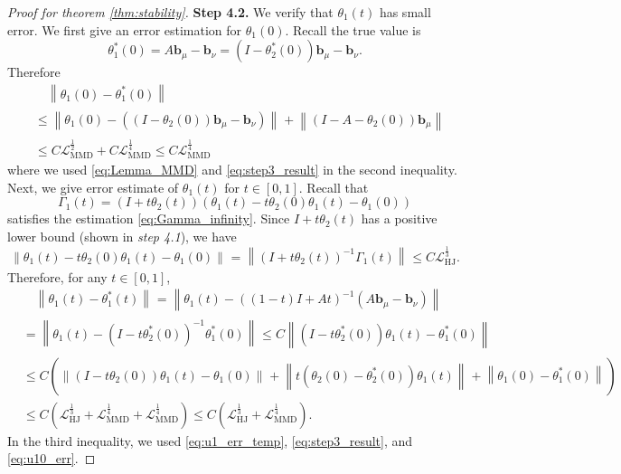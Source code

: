 \documentclass{article} %
\theoremstyle{plain}
\theoremstyle{definition}
\theoremstyle{remark}
\newcommand{\norm}[2][H^s]{\left\|#2\right\|_{#1}}
\newcommand{\bb}{\mathbf{b}}
\newcommand{\LMMD}{\mathcal{L}_{\text{MMD}}}
\newcommand{\LHJ}{\mathcal{L}_{\text{HJ}}}
\newcommand{\Gy}{\Gamma_1}
\newcommand{\parentheses}[1]{\left(#1\right)}
\begin{document}
\begin{proof}[Proof for theorem \ref{thm:stability}]
\medskip
\textbf{Step 4.2.} We verify that $\theta_1(t)$ has small error. We first give an error estimation for $\theta_1(0)$. Recall the true value is 
$$\theta_1^*(0) = A\bb_\mu - \bb_\nu = (I - \theta_2^*(0))\bb_\mu - \bb_\nu.$$
Therefore
\begin{equation}\label{eq:u10_err}
\begin{aligned}
& \quad \norm[]{\theta_1(0) - \theta_1^*(0)} \\
& \le \norm[]{\theta_1(0) - ((I-\theta_2(0))\bb_\mu - \bb_\nu)} + \norm[]{(I-A-\theta_2(0))\bb_\mu}\\
& \le C\LMMD^{\frac12} + C\LMMD^{\frac14} \le C\LMMD^{\frac14}
\end{aligned}
\end{equation}
where we used \eqref{eq:Lemma_MMD} and \eqref{eq:step3_result} in the second inequality. Next, we give error estimate of $\theta_1(t)$ for $t\in[0,1]$. Recall that
$$\Gy(t)  =\parentheses{I + t\theta_2(t)}\parentheses{\theta_1(t) - t \theta_2(0)\theta_1(t) - \theta_1(0)}$$
satisfies the estimation \eqref{eq:Gamma_infinity}. Since $I + t\theta_2(t)$ has a positive lower bound (shown in \emph{step 4.1}), we have
\begin{equation}\label{eq:u1_err_temp}
\norm[]{\theta_1(t) - t \theta_2(0)\theta_1(t) - \theta_1(0)} = \norm[]{(I + t\theta_2(t))^{-1} \Gy(t)} \le C \LHJ^{\frac13}.
\end{equation}
Therefore, for any $t \in [0,1]$,
\begin{equation}\label{eq:u1_err_result}
\begin{aligned}
& \quad \norm[]{\theta_1(t) - \theta_1^*(t)} = \norm[]{\theta_1(t) - \parentheses{(1-t)I + At}^{-1} (A \bb_\mu - \bb_\nu)} \\
& = \norm[]{\theta_1(t) - \parentheses{I-t \theta_2^*(0)}^{-1} \theta_1^*(0)} \le C \norm[]{\parentheses{I-t \theta_2^*(0)} \theta_1(t) -  \theta_1^*(0)} \\
& \le C \parentheses{ \norm[]{\parentheses{I-t \theta_2(0)} \theta_1(t) -  \theta_1(0)} + \norm[]{t (\theta_2(0) - \theta_2^*(0))\theta_1(t)} + \norm[]{\theta_1(0) - \theta_1^*(0)}}\\
& \le C \parentheses{\LHJ^{\frac13} + \LMMD^{\frac14} + \LMMD^{\frac14}} \le C\parentheses{\LHJ^{\frac13} + \LMMD^{\frac14}}.
\end{aligned}
\end{equation}
In the third inequality, we used \eqref{eq:u1_err_temp}, \eqref{eq:step3_result}, and \eqref{eq:u10_err}.


\end{proof}
\end{document}
